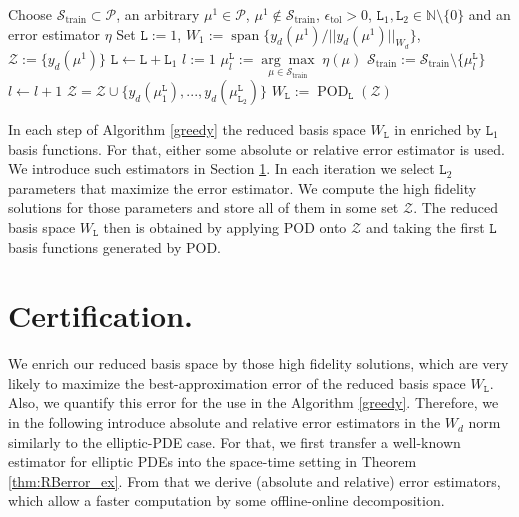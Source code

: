 \documentclass{article}
\theoremstyle{plain}
\theoremstyle{definition}
\theoremstyle{remark}
\DeclareMathOperator{\Span}{span}
\DeclareMathOperator{\POD}{POD}
\begin{document}
\begin{algorithm}%
\caption{POD-greedy procedure}\label{greedy}
\begin{algorithmic}[1]
\State Choose $\mathcal{S}_{\text{train}} \subset \mathcal{P}$, an arbitrary $\mu^{1} \in \mathcal{P}$, $\mu^1 \not\in \mathcal{S}_{\text{train}}$, $\epsilon_{\text{tol}} > 0$, $\texttt{L}_1, \texttt{L}_2 \in \mathbb{N} \setminus \lbrace 0 \rbrace$ and an error estimator $\eta$
\State Set $\texttt{L} := 1$, $W_{1} := \Span \lbrace y_{d}(\mu^{1}) / \vert\vert y_{d}(\mu^{1})\vert\vert_{W_d} \rbrace$, $\mathcal{Z} := \lbrace y_{d}(\mu^{1}) \rbrace$
\State $\texttt{L} \gets \texttt{L} + \texttt{L}_1$
\State $l:=1$
\State $\mu^{\texttt{L}}_{l} := \underset{\mu \in \mathcal{S}_{\text{train}}}{\arg \max} \; \eta(\mu)$\label{alg:online_phase}
\State $\mathcal{S}_{\text{train}} := \mathcal{S}_{\text{train}}\setminus \lbrace \mu^{\texttt{L}}_{l} \rbrace$
\State $l \gets l+1$
\EndWhile
\State $\mathcal{Z} = \mathcal{Z} \cup \lbrace y_{d}(\mu^{\texttt{L}}_1), ..., y_{d}(\mu^{\texttt{L}}_{\texttt{L}_2}) \rbrace$\label{alg:sys_solves}
\State $W_{\texttt{L}} := \POD_{\texttt{L}}(\mathcal{Z})$\label{alg:POD}
\EndWhile
\end{algorithmic}
\end{algorithm}
In each step of Algorithm \ref{greedy} the reduced basis space $W_\texttt{L}$ in enriched by $\texttt{L}_1$ basis functions. For that, either some absolute or relative error estimator is used. We introduce such estimators in Section \ref{subsec:RBCert}. In each iteration we select $\texttt{L}_2$ parameters that maximize the error estimator. We compute the high fidelity solutions for those parameters and store all of them in some set $\mathcal{Z}$. The reduced basis space $W_\texttt{L}$ then is obtained by applying POD onto $\mathcal{Z}$ and taking the first $\texttt{L}$ basis functions generated by POD.

\section{Certification.}\label{subsec:RBCert}
We enrich our reduced basis space by those high fidelity solutions, which are very likely to maximize the best-approximation error of the reduced basis space $W_{\texttt{L}}$. Also, we quantify this error for the use in the Algorithm \ref{greedy}. Therefore, we in the following introduce absolute and relative error estimators in the $W_d$ norm similarly to the elliptic-PDE case. For that, we first transfer a well-known estimator for elliptic PDEs into the space-time setting in Theorem \ref{thm:RBerror_ex}. From that we derive (absolute and relative) error estimators, which allow a faster computation by some offline-online decomposition.\\
\end{document}
